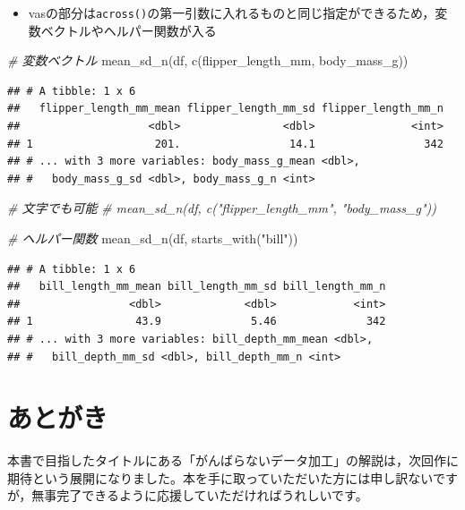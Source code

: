 \documentclass[
  xelatex,ja=standard, b5paper]{bxjsbook}
\newenvironment{Shaded}{\begin{snugshade}}{\end{snugshade}}
\newcommand{\CommentTok}[1]{\textcolor[rgb]{0.56,0.35,0.01}{\textit{#1}}}
\newcommand{\FunctionTok}[1]{\textcolor[rgb]{0.00,0.00,0.00}{#1}}
\newcommand{\NormalTok}[1]{#1}
\newcommand{\StringTok}[1]{\textcolor[rgb]{0.31,0.60,0.02}{#1}}
\providecommand{\tightlist}{%
  \setlength{\itemsep}{0pt}\setlength{\parskip}{0pt}}
\begin{document}
\begin{itemize}
\tightlist
\item
  vasの部分は\texttt{across()}の第一引数に入れるものと同じ指定ができるため，変数ベクトルやヘルパー関数が入る
\end{itemize}

\begin{Shaded}
\begin{Highlighting}[]
\CommentTok{\# 変数ベクトル}
\FunctionTok{mean\_sd\_n}\NormalTok{(df, }\FunctionTok{c}\NormalTok{(flipper\_length\_mm, body\_mass\_g))}
\end{Highlighting}
\end{Shaded}

\begin{verbatim}
## # A tibble: 1 x 6
##   flipper_length_mm_mean flipper_length_mm_sd flipper_length_mm_n
##                    <dbl>                <dbl>               <int>
## 1                   201.                 14.1                 342
## # ... with 3 more variables: body_mass_g_mean <dbl>,
## #   body_mass_g_sd <dbl>, body_mass_g_n <int>
\end{verbatim}

\begin{Shaded}
\begin{Highlighting}[]
\CommentTok{\# 文字でも可能}
\CommentTok{\# mean\_sd\_n(df, c("flipper\_length\_mm", "body\_mass\_g"))}

\CommentTok{\# ヘルパー関数}
\FunctionTok{mean\_sd\_n}\NormalTok{(df, }\FunctionTok{starts\_with}\NormalTok{(}\StringTok{"bill"}\NormalTok{))}
\end{Highlighting}
\end{Shaded}

\begin{verbatim}
## # A tibble: 1 x 6
##   bill_length_mm_mean bill_length_mm_sd bill_length_mm_n
##                 <dbl>             <dbl>            <int>
## 1                43.9              5.46              342
## # ... with 3 more variables: bill_depth_mm_mean <dbl>,
## #   bill_depth_mm_sd <dbl>, bill_depth_mm_n <int>
\end{verbatim}

\hypertarget{atogaki}{%
\chapter*{あとがき}\label{atogaki}}

本書で目指したタイトルにある「がんばらないデータ加工」の解説は，次回作に期待という展開になりました。本を手に取っていただいた方には申し訳ないですが，無事完了できるように応援していただければうれしいです。
\end{document}
